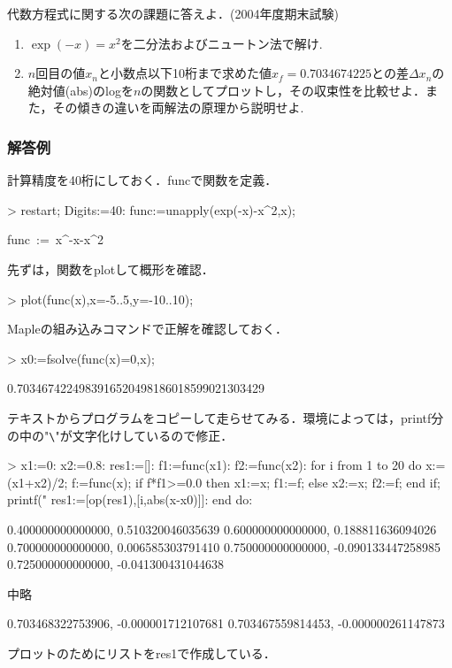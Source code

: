代数方程式に関する次の課題に答えよ．(2004年度期末試験)
\begin{enumerate}
\item $\exp(-x) = x^2$を二分法およびニュートン法で解け.
\item $n$回目の値$x_n$と小数点以下10桁まで求めた値$x_f=0.7034674225$との差$\Delta x_n$の絶対値(abs)のlogを$n$の関数としてプロットし，その収束性を比較せよ．また，その傾きの違いを両解法の原理から説明せよ.
\end{enumerate}

\subsubsection{解答例}
計算精度を40桁にしておく．funcで関数を定義．
\begin{MapleInput}
> restart; Digits:=40: func:=unapply(exp(-x)-x^2,x);
\end{MapleInput}
\begin{MapleOutput}
func\, := \,x^{-x}-{x}^{2}
\end{MapleOutput}
先ずは，関数をplotして概形を確認．
\begin{MapleInput}
> plot(func(x),x=-5..5,y=-10..10);
\end{MapleInput}
Mapleの組み込みコマンドで正解を確認しておく．
\begin{MapleInput}
> x0:=fsolve(func(x)=0,x);
\end{MapleInput}
\begin{MapleOutput}
0.7034674224983916520498186018599021303429
\end{MapleOutput}
テキストからプログラムをコピーして走らせてみる．環境によっては，printf分の中の"\verb|\|"が文字化けしているので修正．
\begin{MapleInput}
> x1:=0: x2:=0.8: res1:=[]:
  f1:=func(x1): f2:=func(x2):
  for i from 1 to 20 do
    x:=(x1+x2)/2;
    f:=func(x);
    if f*f1>=0.0 then
      x1:=x; f1:=f;
    else
      x2:=x; f2:=f;
    end if;
    printf("%
    res1:=[op(res1),[i,abs(x-x0)]]:
  end do:
\end{MapleInput}
\begin{MapleError}
0.400000000000000, 0.510320046035639 
0.600000000000000, 0.188811636094026
0.700000000000000, 0.006585303791410 
0.750000000000000, -0.090133447258985
0.725000000000000, -0.041300431044638 

中略

0.703468322753906, -0.000001712107681 
0.703467559814453, -0.000000261147873
\end{MapleError}
プロットのためにリストをres1で作成している．

